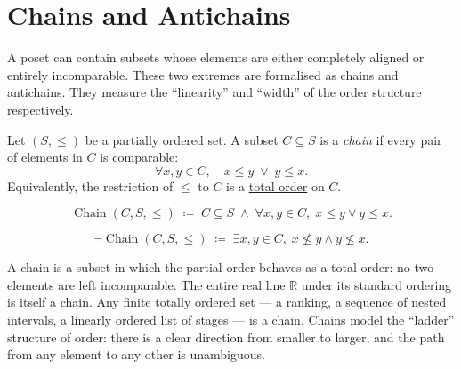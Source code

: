 
\section{Chains and Antichains}
\label{sec:chains-antichains}

\begin{tcolorbox}[
  colback=gray!6,
  colframe=gray!40,
  arc=2pt,
  left=8pt, right=8pt, top=6pt, bottom=6pt,
  title={\small\textbf{Toolkit: Chains and Antichains}},
  fonttitle=\small\bfseries
]
A poset can contain subsets whose elements are either completely aligned
or entirely incomparable.  These two extremes are formalised as chains and
antichains.  They measure the ``linearity'' and ``width'' of the order
structure respectively.
\end{tcolorbox}


\begin{tcolorbox}[colback=defbox, colframe=defborder, arc=2pt,
  left=6pt, right=6pt, top=4pt, bottom=4pt,
  title={\small\textbf{Definition (Chain)}},
  fonttitle=\small\bfseries]
\begin{definition}[Chain]
\label{def:chain}
Let $(S, \leq)$ be a partially ordered set.  A subset $C \subseteq S$ is a
\emph{chain} if every pair of elements in $C$ is comparable:
\[
\forall x, y \in C, \quad x \leq y \;\lor\; y \leq x.
\]
Equivalently, the restriction of $\leq$ to $C$ is a
\hyperref[def:lattice-order-total-order]{total order} on $C$.
\end{definition}
\end{tcolorbox}

\begin{remark*}
\[
\operatorname{Chain}(C, S, \leq)
\;\coloneqq\;
C \subseteq S
\;\land\;
\forall x, y \in C,\; x \leq y \lor y \leq x.
\]
\end{remark*}

\begin{remark*}
\[
\neg\operatorname{Chain}(C, S, \leq)
\;\coloneqq\;
\exists x, y \in C,\; x \not\leq y \land y \not\leq x.
\]
\end{remark*}

\begin{remark*}[Interpretation]
A chain is a subset in which the partial order behaves as a total order:
no two elements are left incomparable.  The entire real line $\mathbb{R}$
under its standard ordering is itself a chain.  Any finite totally ordered
set — a ranking, a sequence of nested intervals, a linearly ordered list
of stages — is a chain.  Chains model the ``ladder'' structure of order:
there is a clear direction from smaller to larger, and the path from any
element to any other is unambiguous.
\end{remark*}

